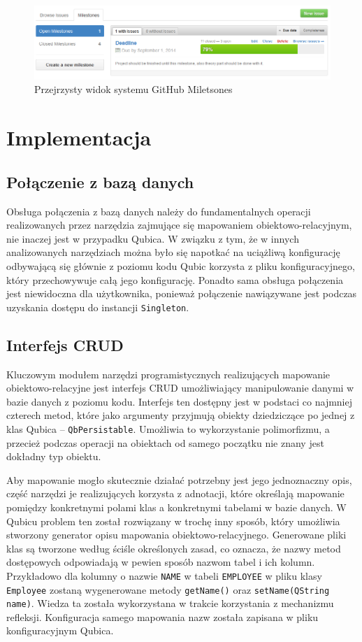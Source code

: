 \documentclass[12pt]{report}
\begin{document}
\begin{figure}[h!]
\centering
\includegraphics[width=\textwidth]{resources/githubmilestone.png}
\caption{Przejrzysty widok systemu GitHub Miletsones}
\end{figure}

\section{Implementacja}

\subsection{Połączenie z bazą danych}

Obsługa połączenia z bazą danych należy do fundamentalnych operacji realizowanych przez narzędzia zajmujące się mapowaniem obiektowo-relacyjnym, nie inaczej jest w
przypadku Qubica. W związku z tym, że w innych analizowanych narzędziach można było się napotkać na uciążliwą konfigurację odbywającą się głównie z poziomu kodu
Qubic korzysta z pliku konfiguracyjnego, który przechowywuje całą jego konfigurację. Ponadto sama obsługa połączenia jest niewidoczna dla użytkownika, ponieważ
połączenie nawiązywane jest podczas uzyskania dostępu do instancji {\tt Singleton}. 

\subsection{Interfejs CRUD}

Kluczowym modułem narzędzi programistycznych realizujących mapowanie obiekt\-owo-relacyjne jest interfejs CRUD umożliwiający manipulowanie danymi w bazie danych z 
poziomu kodu. Interfejs ten dostępny jest w podstaci co najmniej czterech metod, które jako argumenty przyjmują obiekty dziedziczące po jednej z klas Qubica -- 
{\tt QbPersistable}. Umożliwia to wykorzystanie polimorfizmu, a przecież podczas operacji na obiektach od samego początku nie znany jest dokładny typ obiektu.

Aby mapowanie mogło skutecznie działać potrzebny jest jego jednoznaczny opis, część narzędzi je realizujących korzysta z adnotacji, które określają mapowanie pomiędzy
konkretnymi polami klas a konkretnymi tabelami w bazie danych. W Qubicu problem ten został rozwiązany w trochę inny sposób, który umożliwia stworzony generator opisu
mapowania obiektowo-relacyjnego. Generowane pliki klas są tworzone według ściśle określonych zasad, co oznacza, że nazwy metod dostępowych odpowiadają w pewien
sposób nazwom tabel i ich kolumn. Przykładowo dla kolumny o nazwie {\tt NAME} w tabeli {\tt EMPLOYEE} w pliku klasy {\tt Employee} zostaną wygenerowane metody 
{\tt getName()} oraz {\tt setName(QString name)}. Wie\-dza ta została wykorzystana w trakcie korzystania z mechanizmu refleksji. Konfiguracja samego mapowania nazw
została zapisana w pliku konfiguracyjnym Qubica.
\end{document}
